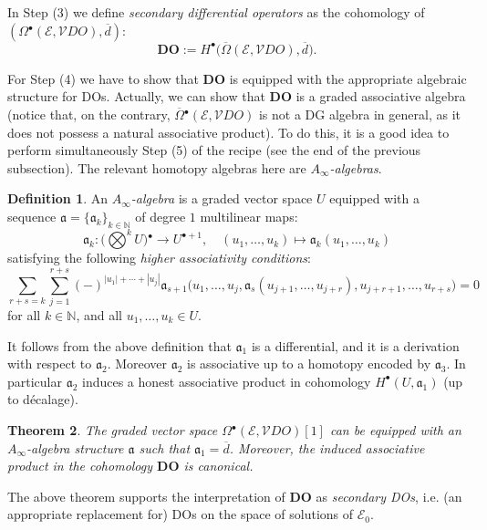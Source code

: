 \documentclass{conm-p-l}
\newtheorem{theorem}{Theorem}[section]
\theoremstyle{definition}
\newtheorem{definition}[theorem]{Definition}
\theoremstyle{remark}
\numberwithin{equation}{section}
\begin{document}
In Step (3) we define \emph{secondary differential operators} as the cohomology of $(\Omega{}^\bullet (\mathscr E, \mathscr V DO), \overline d)$:
\[
\boldsymbol{DO} := H^\bullet \big( \overline \Omega (\mathscr E, \mathscr V DO), \overline d \big).
\]

For Step (4) we have to show that $\boldsymbol{DO}$ is equipped with the appropriate algebraic structure for DOs. Actually, we can show that $\boldsymbol{DO}$ is a graded associative algebra (notice that, on the contrary, $\overline \Omega{}^\bullet (\mathscr E, \mathscr V DO)$ is not a DG algebra in general, as it does not possess a natural associative product). To do this, it is a good idea to perform simultaneously Step (5) of the recipe (see the end of the previous subsection). The relevant homotopy algebras here are \emph{$A_\infty$-algebras}.

\begin{definition}
An \emph{$A_\infty$-algebra} \cite{ls93, lm95} is a graded vector space $U$ equipped with a sequence $\mathfrak a = \{\mathfrak a_k\}_{k \in \mathbb N}$ of degree $1$ multilinear maps:
\[
\mathfrak a_k : \big(\textstyle\bigotimes^k U\big){}^\bullet \to U^{\bullet + 1}, \quad (u_1, \ldots, u_k) \mapsto \mathfrak a_k (u_1, \ldots, u_k)
\]
satisfying the following \emph{higher associativity conditions}:
\[
\sum_{r+s = k} \sum_{j=1}^{r+s}(-)^{|u_1| + \cdots + |u_j|} \mathfrak a_{s+1}\big(u_1, \ldots, u_j, \mathfrak a_{s} (u_{j+1}, \ldots, u_{j + r}), u_{j+r+1}, \ldots, u_{r+s}\big) = 0
\]
for all $k \in \mathbb N$, and all $u_1, \ldots, u_k \in U$.
\end{definition}

It follows from the above definition that $\mathfrak a_1$ is a differential, and it is a derivation with respect to $\mathfrak a_2$. Moreover $\mathfrak a_2$ is associative up to a homotopy encoded by $\mathfrak a_3$. In particular $\mathfrak a_2$ induces a honest associative product in cohomology $H^\bullet (U, \mathfrak a_1)$ (up to d\'ecalage).

\begin{theorem}\label{theor:DO_sec}
The graded vector space $\Omega{}^\bullet (\mathscr E, \mathscr V DO)[1]$ can be equipped with an $A_\infty$-algebra structure $\mathfrak a$ such that $\mathfrak a_1 = \overline d$. Moreover, the induced associative product in the cohomology $\boldsymbol{DO}$ is canonical.
\end{theorem}

The above theorem supports the interpretation of $\boldsymbol{DO}$ as \emph{secondary DOs}, i.e.{} (an appropriate replacement for) DOs on the space of solutions of $\mathscr E_0$.
\end{document}
